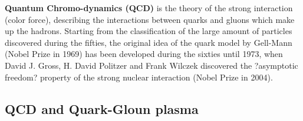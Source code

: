 \textbf{Quantum Chromo-dynamics (QCD)} is the theory of the strong interaction (color force), describing the interactions between quarks and gluons which make up the hadrons. Starting from the classification of the large amount of particles discovered during the fifties, the original idea of the quark model by Gell-Mann (Nobel Prize in 1969) has been developed during the sixties until 1973, when David J. Gross, H. David Politzer and Frank Wilczek discovered the ?asymptotic freedom? property of the strong nuclear interaction (Nobel Prize in 2004).

\subsection{QCD and Quark-Gloun plasma}
            
